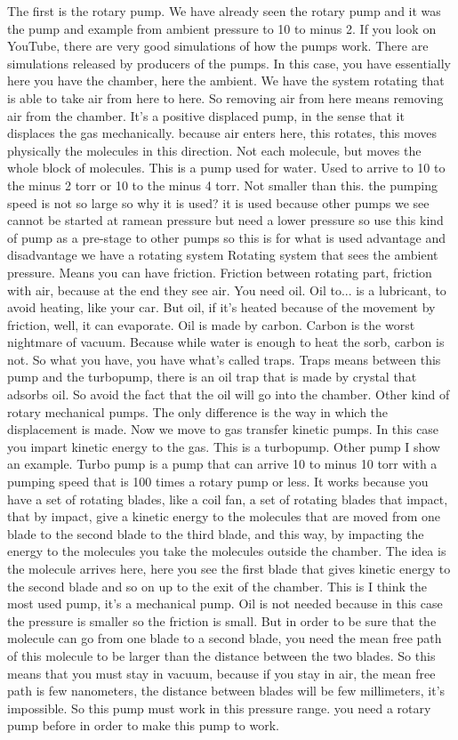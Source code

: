 The first is the rotary pump. We have already seen the rotary pump and it was the pump and example from ambient pressure to 10 to minus 2. If you look on YouTube, there are very good simulations of how the pumps work. There are simulations released by producers of the pumps. In this case, you have essentially here you have the chamber, here the ambient. We have the system rotating that is able to take air from here to here. So removing air from here means removing air from the chamber. It's a positive displaced pump, in the sense that it displaces the gas mechanically. because air enters here, this rotates, this moves physically the molecules in this direction. Not each molecule, but moves the whole block of molecules. This is a pump used for water. Used to arrive to 10 to the minus 2 torr or 10 to the minus 4 torr. Not smaller than this. the pumping speed is not so large so why it is used? it is used because other pumps we see cannot be started at ramean pressure but need a lower pressure so use this kind of pump as a pre-stage to other pumps so this is for what is used advantage and disadvantage we have a rotating system Rotating system that sees the ambient pressure. Means you can have friction. Friction between rotating part, friction with air, because at the end they see air. You need oil. Oil to... is a lubricant, to avoid heating, like your car. But oil, if it's heated because of the movement by friction, well, it can evaporate. Oil is made by carbon. Carbon is the worst nightmare of vacuum. Because while water is enough to heat the sorb, carbon is not. So what you have, you have what's called traps. Traps means between this pump and the turbopump, there is an oil trap that is made by crystal that adsorbs oil. So avoid the fact that the oil will go into the chamber.
Other kind of rotary mechanical pumps. The only difference is the way in which the displacement is made.
Now we move to gas transfer kinetic pumps. In this case you impart kinetic energy to the gas. This is a turbopump. Other pump I show an example. Turbo pump is a pump that can arrive 10 to minus 10 torr with a pumping speed that is 100 times a rotary pump or less. It works because you have a set of rotating blades, like a coil fan, a set of rotating blades that impact, that by impact, give a kinetic energy to the molecules that are moved from one blade to the second blade to the third blade, and this way, by impacting the energy to the molecules you take the molecules outside the chamber. The idea is the molecule arrives here, here you see the first blade that gives kinetic energy to the second blade and so on up to the exit of the chamber. This is I think the most used pump, it's a mechanical pump. Oil is not needed because in this case the pressure is smaller so the friction is small. But in order to be sure that the molecule can go from one blade to a second blade, you need the mean free path of this molecule to be larger than the distance between the two blades. So this means that you must stay in vacuum, because if you stay in air, the mean free path is few nanometers, the distance between blades will be few millimeters, it's impossible. So this pump must work in this pressure range. you need a rotary pump before in order to make this pump to work.
